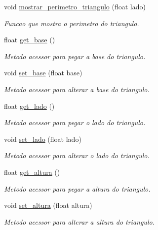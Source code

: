 \begin{DoxyCompactItemize}
void \hyperlink{classTriangulo_acd48a4eeff79b39b045d1f41aff72989}{mostrar\+\_\+perimetro\+\_\+triangulo} (float lado)
\begin{DoxyCompactList}\small\item\em Funcao que mostra o perimetro do triangulo. \end{DoxyCompactList}\item 
float \hyperlink{classTriangulo_a1f5be10a4be1573deb30a2c3183854cc}{get\+\_\+base} ()
\begin{DoxyCompactList}\small\item\em Metodo acessor para pegar a base do triangulo. \end{DoxyCompactList}\item 
void \hyperlink{classTriangulo_ae966bb0f31c5d2f5743fb3beffa84c28}{set\+\_\+base} (float base)
\begin{DoxyCompactList}\small\item\em Metodo acessor para alterar a base do triangulo. \end{DoxyCompactList}\item 
float \hyperlink{classTriangulo_ab3004c72c6d231a0aec6178e17ab7d19}{get\+\_\+lado} ()
\begin{DoxyCompactList}\small\item\em Metodo acessor para pegar o lado do triangulo. \end{DoxyCompactList}\item 
void \hyperlink{classTriangulo_a83ef4ab9aecb441ef81603227d4dd141}{set\+\_\+lado} (float lado)
\begin{DoxyCompactList}\small\item\em Metodo acessor para alterar o lado do triangulo. \end{DoxyCompactList}\item 
float \hyperlink{classTriangulo_a1ba1414ed8d54f57ef3d0849857cfeb7}{get\+\_\+altura} ()
\begin{DoxyCompactList}\small\item\em Metodo acessor para pegar a altura do triangulo. \end{DoxyCompactList}\item 
void \hyperlink{classTriangulo_a9a4ee8d44d7ea23d118bbf9cc72157a2}{set\+\_\+altura} (float altura)
\begin{DoxyCompactList}\small\item\em Metodo acessor para alterar a altura do triangulo. \end{DoxyCompactList}\end{DoxyCompactItemize}


